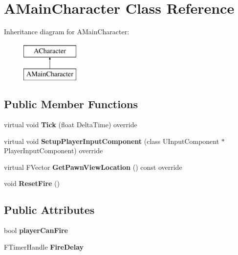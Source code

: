 \hypertarget{class_a_main_character}{}\section{A\+Main\+Character Class Reference}
\label{class_a_main_character}
Inheritance diagram for A\+Main\+Character\+:\begin{figure}[H]
\begin{center}
\leavevmode
\includegraphics[height=2.000000cm]{class_a_main_character}
\end{center}
\end{figure}
\subsection*{Public Member Functions}
\begin{DoxyCompactItemize}
\item 
\mbox{\label{class_a_main_character_a44a6be77fb1c8617c144a85fc084ad2b}} 
virtual void {\bfseries Tick} (float Delta\+Time) override
\item 
\mbox{\label{class_a_main_character_a96eb814e0d995ca16f33e92256756046}} 
virtual void {\bfseries Setup\+Player\+Input\+Component} (class U\+Input\+Component $\ast$Player\+Input\+Component) override
\item 
\mbox{\label{class_a_main_character_adb24c0fcbd3fe89d3b246981b16b8b5e}} 
virtual F\+Vector {\bfseries Get\+Pawn\+View\+Location} () const override
\item 
\mbox{\label{class_a_main_character_a2e3680c05b799891aa06311103314f40}} 
void {\bfseries Reset\+Fire} ()
\end{DoxyCompactItemize}
\subsection*{Public Attributes}
\begin{DoxyCompactItemize}
\item 
\mbox{\label{class_a_main_character_a03aaa75e5621aece381717731ade0529}} 
bool {\bfseries player\+Can\+Fire}
\item 
\mbox{\label{class_a_main_character_aeb723bc23c75b06e706ae1e973d6e14e}} 
F\+Timer\+Handle {\bfseries Fire\+Delay}
\end{DoxyCompactItemize}
